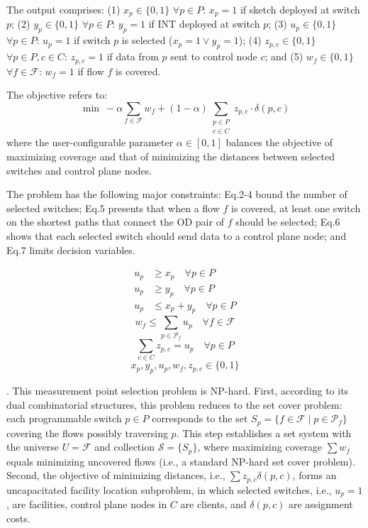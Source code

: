  The output comprises:
(1) $x_p \in \{0,1\}$ $\forall p \in P$: $x_p=1$ if sketch deployed at switch $p$;
(2) $y_p \in \{0,1\}$ $\forall p \in P$: $y_p=1$ if INT deployed at switch $p$;
(3) $u_p \in \{0,1\}$ $\forall p \in P$: $u_p=1$ if switch $p$ is selected ($x_p =1 \lor y_p=1$);
(4) $z_{p,c} \in \{0,1\}$ $\forall p \in P, c \in C$: $z_{p,c}=1$ if data from $p$ sent to control node $c$;
and (5) $w_f \in \{0,1\}$ $\forall f \in \mathcal{F}$: $w_f=1$ if flow $f$ is covered.

 The objective refers to:
\begin{equation}
\min\ -\alpha \sum_{f \in \mathcal{F}} w_f + (1-\alpha) \sum_{\substack{p \in P \\ c \in C}} z_{p,c} \cdot \delta(p, c)
\label{eq:objective}
\end{equation}
where the user-configurable parameter $\alpha \in [0,1]$ balances the objective of maximizing coverage and that of minimizing the distances between selected switches and control plane nodes.

 The problem has the following major constraints: Eq.2-4 bound the number of selected switches; Eq.5 presents that when a flow $f$ is covered, at least one switch on the shortest paths that connect the OD pair of $f$ should be selected; Eq.6 shows that each selected switch should send data to a control plane node; and Eq.7 limits decision variables. 

\vspace{-7pt}
{\footnotesize
\begin{align}
u_p &\geq x_p \quad \forall p \in P \\
u_p &\geq y_p \quad \forall p \in P \\
u_p &\leq x_p + y_p \quad \forall p \in P 
\end{align}
\begin{equation}
    w_f \leq \sum_{p \in \mathcal{P}_f} u_p \quad \forall f \in \mathcal{F}
\end{equation}
\begin{equation}
    \sum_{c \in C} z_{p,c} = u_p \quad \forall p \in P
\end{equation}
\begin{equation}
    x_p, y_p, u_p, w_f, z_{p,c} \in \{0,1\}
\end{equation}}

. This measurement point selection problem is NP-hard. First, according to its dual combinatorial structures, this problem reduces to the set cover problem: each programmable switch $p \in P$ corresponds to the set $S_p = \{ f \in \mathcal{F} \mid p \in \mathcal{P}_f \}$ covering the flows possibly traversing $p$. This step establishes a set system with the universe $U = \mathcal{F}$ and collection $\mathcal{S} = \{ S_p \}$, where maximizing coverage $\sum w_f$ equals minimizing uncovered flows (i.e., a standard NP-hard set cover problem). Second, the objective of minimizing distances, i.e., $\sum z_{p,c} \delta(p,c)$, forms an uncapacitated facility location subproblem, in which selected switches, i.e., $u_p=1$, are facilities, control plane nodes in $C$ are clients, and $\delta(p,c)$ are assignment costs. 

